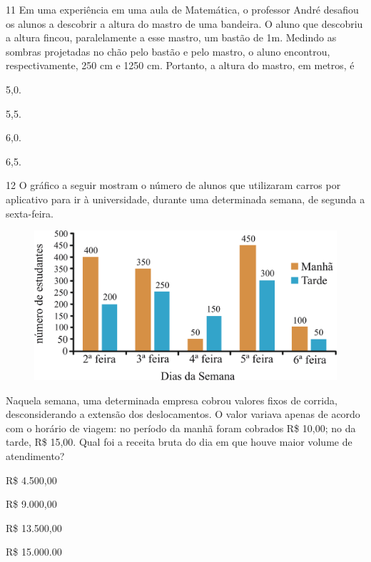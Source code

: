 \num{11} Em uma experiência em uma aula de Matemática, o professor André
desafiou os alunos a descobrir a altura do mastro de uma bandeira. O aluno
que descobriu a altura fincou, paralelamente a esse mastro, um bastão de
1m. Medindo as sombras projetadas no chão pelo bastão e pelo mastro,
o aluno encontrou, respectivamente, 250 cm e 1250 cm. Portanto, a altura do
mastro, em metros, é

\begin{escolha}

  \item 5,0.

  \item 5,5.

  \item 6,0.

  \item 6,5.

\end{escolha}

\pagebreak
\num{12} O gráfico a seguir mostram o número de alunos que utilizaram
carros por aplicativo para ir à universidade, durante uma determinada
semana, de segunda a sexta-feira.

\begin{figure}[htpb!]
\centering
\includegraphics[width=\textwidth]{./ilustras-mat/Simulado_2-atividade_12.png}
\end{figure}

Naquela semana, uma determinada empresa cobrou valores fixos de corrida,
desconsiderando a extensão dos deslocamentos. O valor variava apenas de 
acordo com o horário de viagem: no período da manhã foram cobrados 
R\$ 10,00; no da tarde, R\$ 15,00. Qual foi a receita bruta do dia 
em que houve maior volume de atendimento?

\begin{escolha}

  \item R\$ 4.500,00

  \item R\$ 9.000,00

  \item R\$ 13.500,00

  \item R\$ 15.000.00

\end{escolha}


